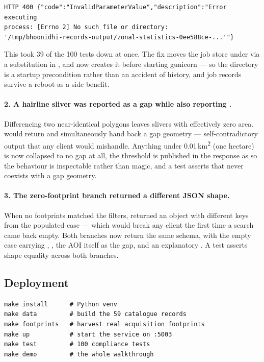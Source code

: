 \begin{lstlisting}
HTTP 400 {"code":"InvalidParameterValue","description":"Error executing
process: [Errno 2] No such file or directory:
'/tmp/bhoonidhi-records-output/zonal-statistics-0ee588ce-...'"}
\end{lstlisting}

This took 39 of the 100 tests down at once. The fix moves the job store under
 via a  substitution in
, and  now creates it before starting
gunicorn --- so the directory is a startup precondition rather than an
accident of history, and job records survive a reboot as a side benefit.

\paragraph{2. A hairline sliver was reported as a gap while also reporting
.} Differencing two near-identical polygons leaves
slivers with effectively zero area.  would return
 and simultaneously hand back a gap geometry ---
self-contradictory output that any client would mishandle. Anything under
0.01\,km\textsuperscript{2} (one hectare) is now collapsed to no gap at all,
the threshold is published in the response as  so
the behaviour is inspectable rather than magic, and a test asserts that
 never coexists with a gap geometry.

\paragraph{3. The zero-footprint branch returned a different JSON shape.}
When no footprints matched the filters,  returned an object
with different keys from the populated case --- which would break any client
the first time a search came back empty. Both branches now return the same
schema, with the empty case carrying ,
, the AOI itself as the gap, and an explanatory
. A test asserts shape equality across both branches.

\subsection{Deployment}

\begin{lstlisting}
make install      # Python venv
make data         # build the 59 catalogue records
make footprints   # harvest real acquisition footprints
make up           # start the service on :5003
make test         # 100 compliance tests
make demo         # the whole walkthrough
\end{lstlisting}

